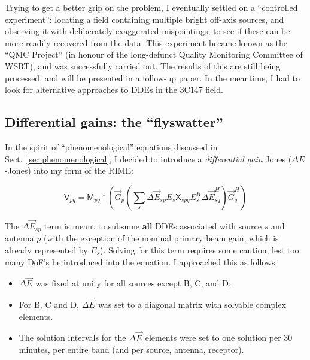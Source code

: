 \documentclass[]{aa}
\newcommand{\herm}{H}
\newcommand{\jones}[2]{\vec {#1}_{#2}}
\newcommand{\jonesT}[2]{\vec {#1}^{\herm}_{#2}}
\newcommand{\coh}[2]{\mathsf{{#1}}_{{#2}}}
\begin{document}
Trying to get a better grip on the problem, I eventually settled on a ``controlled experiment'':
locating a field containing multiple bright off-axis sources, and observing it with deliberately exaggerated mispointings, to see if these can be more readily recovered from the data. This experiment became known as the ``QMC Project'' (in honour of the long-defunct Quality Monitoring Committee of WSRT), and was successfully carried out. The results of this are still being processed, and will be presented in a follow-up paper. 
In the meantime, I had to look for alternative approaches to DDEs in the 3C147 field.

\subsection{Differential gains: the ``flyswatter''\label{sec:diffgains}}

In the spirit of ``phenomenological'' equations discussed in Sect.~\ref{sec:phenomenological}, I decided to introduce a {\em differential gain} Jones ($\Delta E$-Jones) into my form of the RIME:

\begin{equation}\label{eq:3C147:de}
\coh{V}{pq} = \coh{M}{pq} \ast \left ( \jones{G}{p} \left( \sum_s \Delta\jones{E}{sp} E_s \coh{X}{spq} E^{\herm}_s \Delta\jonesT{E}{sq} \right)  \jonesT{G}{q} \right )
\end{equation}

The $\Delta\jones{E}{sp}$ term is meant to subsume {\bf all} DDEs associated with source $s$ and antenna $p$ (with the exception of the nominal primary beam gain, which is already represented by $E_s$). Solving for this term requires some caution, lest too many DoF's be introduced into the equation. I approached this as follows:

\begin{itemize}
\item $\Delta\jones{E}{}$ was fixed at unity for all sources except B, C, and D;
\item For B, C and D, $\Delta\jones{E}{}$ was set to a diagonal matrix with solvable complex elements.
\item The solution intervals for the $\Delta\jones{E}{}$ elements were set to one solution per 30 minutes, per entire band (and per source, antenna, receptor).
\end{itemize}
\end{document}

